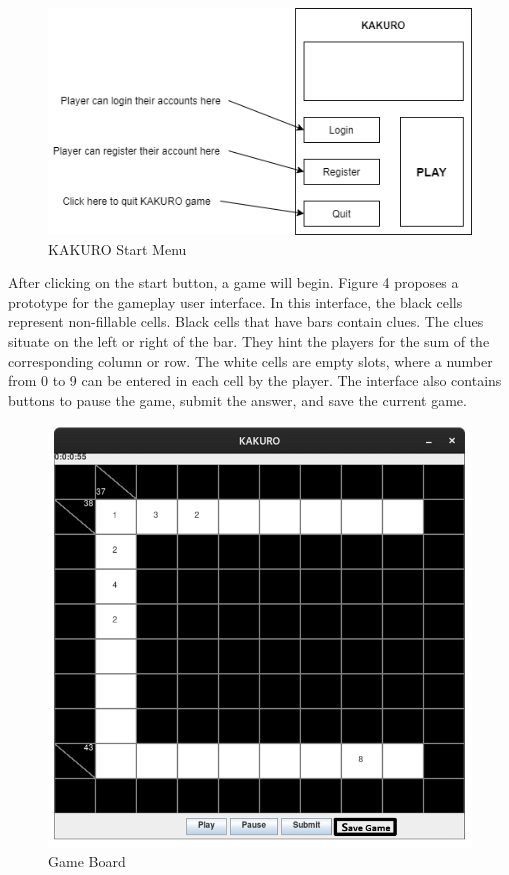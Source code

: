 \documentclass[12pt]{article}
\begin{document}
\begin{figure}[htbp]
    \centering
    \includegraphics[scale=0.8]{UI-1.png}
    \caption{KAKURO Start Menu}
    \label{fig:UI-1}
\end{figure}

After clicking on the start button, a game will begin. Figure 4 proposes a prototype for the gameplay user interface. In this interface, the black cells represent non-fillable cells. Black cells that have bars contain clues. The clues situate on the left or right of the bar. They hint the players for the sum of the corresponding column or row. The white cells are empty slots, where a number from 0 to 9 can be entered in each cell by the player. The interface also contains buttons to pause the game, submit the answer, and save the current game. 

\begin{figure}[htbp]
    \centering
    \includegraphics[scale=0.5]{UI-0.png}
    \caption{Game Board}
    \label{fig:UI-0}
\end{figure}
\end{document}
